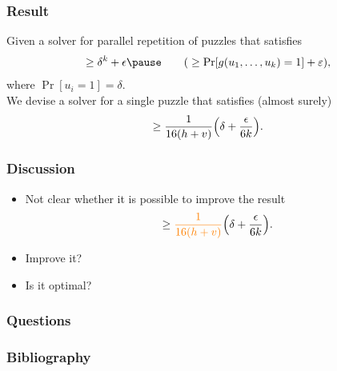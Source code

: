 \documentclass[first,firstsupp,notes, handout, last]{ETHclass}
\begin{document}
\begin{frame} [t]
  \frametitle{Result}
      Given a solver for parallel repetition of puzzles that satisfies\\
      \begin{align*}
        \geq \delta^k + \epsilon \text{\hspace{20pt\pause}(} \geq \Pr[g(u_1, \dots, u_k) = 1] + \varepsilon \text{)},
      \end{align*}
      where $\Pr[u_i = 1] = \delta$. \\
      \pause
      \vspace{25pt}
      We devise a solver for a single puzzle that satisfies (almost surely)
      \begin{align*}
         \geq \frac{1}{16(h+v)} \Bigl(\delta + \frac{\epsilon}{6k}\Bigr).
      \end{align*}
\end{frame}

\begin{frame}[t]
  \frametitle{Discussion}
  \begin{itemize}
    \item Not clear whether it is possible to improve the result
      \begin{align*}
         \geq \textcolor{orange}{\frac{1}{16(h+v)}} \Bigl(\delta + \frac{\epsilon}{6k}\Bigr).
      \end{align*}
      \pause
    \item Improve it? \pause \textcolor{orange}{\xmark}
    \item Is it optimal? \pause \textcolor{orange}{\xmark}
  \end{itemize}
\end{frame}

\begin{frame}
\frametitle{Questions}
\end{frame}


\begin{frame}[t]
\frametitle{Bibliography}


\end{frame}
\end{document}
